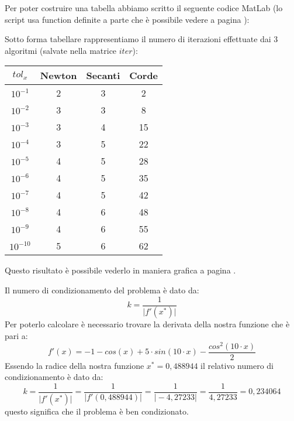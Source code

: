 \begin{flushleft}
Per poter costruire una tabella abbiamo scritto il seguente codice MatLab (lo script usa function definite a parte che è possibile vedere a pagina \pageref{functcap2}):

Sotto forma tabellare rappresentiamo il numero di iterazioni effettuate dai 3 algoritmi (salvate nella matrice $iter$):

\begin{center}
\begin{tabular}{|c|c|c|c|}
\hline
$tol_x$ & Newton & Secanti & Corde \\
\hline
$10^{-1}$ & 2 & 3 & 2 \\
$10^{-2}$ & 3 & 3 & 8 \\
$10^{-3}$ & 3 & 4 & 15 \\
$10^{-4}$ & 3 & 5 & 22 \\
$10^{-5}$ & 4 & 5 & 28 \\
$10^{-6}$ & 4 & 5 & 35 \\
$10^{-7}$ & 4 & 5 & 42 \\
$10^{-8}$ & 4 & 6 & 48 \\
$10^{-9}$ & 4 & 6 & 55 \\
$10^{-10}$ & 5 & 6 & 62 \\
\hline
\end{tabular}
\end{center}

Questo risultato è possibile vederlo in maniera grafica a pagina \pageref{fes26}.

Il numero di condizionamento del problema è dato da:
\[
k = \frac{1}{\big|f'(x^*)\big|}
\]
Per poterlo calcolare è necessario trovare la derivata della nostra funzione che è pari a:
\[
f'(x) = -1 - cos(x) + 5 \cdot sin(10\cdot x) - \frac{cos^2(10\cdot x)}{2}
\]
Essendo la radice della nostra funzione  $x^* = 0,488944$ il relativo numero di condizionamento è dato da:
\[
k = \frac{1}{\Big|f'(x^*)\Big|} = \frac{1}{\Big|f'(0,488944)\Big|} = \frac{1}{\Big|-4,27233\Big|} = \frac{1}{4,27233} = 0,234064
\]
questo significa che il problema è ben condizionato.
\end{flushleft}